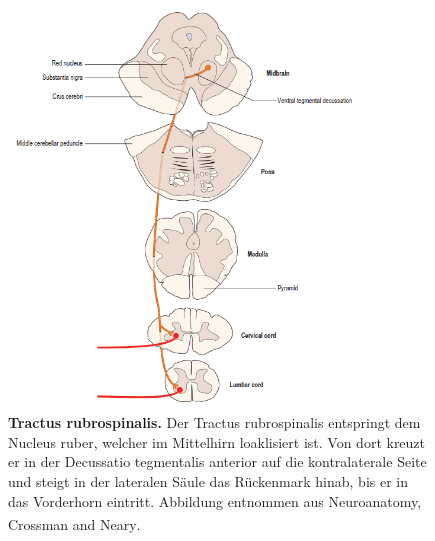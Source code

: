\documentclass[12pt,a4paper,pdftex]{article}
\begin{document}
\begin{figure}[H]
    \centering
    \includegraphics[width=0.85\textwidth]{pictures/Bilder_Laura/rubrospinal_tract.PNG}
    \caption[Tractus rubrospinalis]{\textbf{Tractus rubrospinalis.} Der Tractus rubrospinalis entspringt dem Nucleus ruber, welcher im Mittelhirn loaklisiert ist. Von dort kreuzt er in der Decussatio tegmentalis anterior auf die kontralaterale Seite und steigt in der lateralen Säule das Rückenmark hinab, bis er in das Vorderhorn eintritt. Abbildung entnommen aus Neuroanatomy, Crossman and Neary\textsuperscript{\cite[8]{crossman2014neuroanatomy}}.}
    \label{fig:tr_rubrospinalis}
\end{figure}
\end{document}
